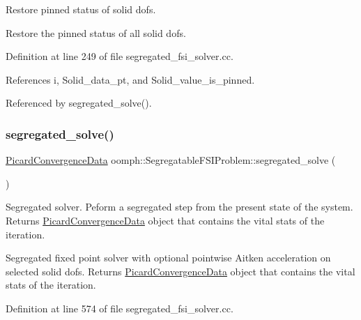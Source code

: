 Restore pinned status of solid dofs. 

Restore the pinned status of all solid dofs. 

Definition at line 249 of file segregated\+\_\+fsi\+\_\+solver.\+cc.



References i, Solid\+\_\+data\+\_\+pt, and Solid\+\_\+value\+\_\+is\+\_\+pinned.



Referenced by segregated\+\_\+solve().

\mbox{\label{classoomph_1_1SegregatableFSIProblem_a87a69561674c1e596bb205e0fc4a387f}} 
\subsubsection{\texorpdfstring{segregated\+\_\+solve()}{segregated\_solve()}}
{\footnotesize\ttfamily \hyperlink{classoomph_1_1PicardConvergenceData}{Picard\+Convergence\+Data} oomph\+::\+Segregatable\+F\+S\+I\+Problem\+::segregated\+\_\+solve (\begin{DoxyParamCaption}{ }\end{DoxyParamCaption})}



Segregated solver. Peform a segregated step from the present state of the system. Returns \hyperlink{classoomph_1_1PicardConvergenceData}{Picard\+Convergence\+Data} object that contains the vital stats of the iteration. 

Segregated fixed point solver with optional pointwise Aitken acceleration on selected solid dofs. Returns \hyperlink{classoomph_1_1PicardConvergenceData}{Picard\+Convergence\+Data} object that contains the vital stats of the iteration. 

Definition at line 574 of file segregated\+\_\+fsi\+\_\+solver.\+cc.



